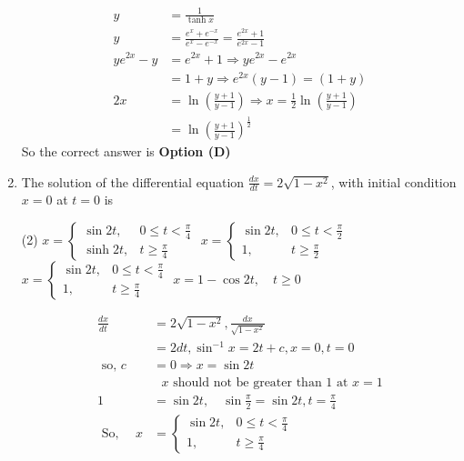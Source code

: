 \begin{enumerate}[label=\color{ocre}\textbf{\arabic*.}]
	\begin{answer}
		\begin{align*}
		y&=\frac{1}{\tanh x}\\
		y&=\frac{e^{x}+e^{-x}}{e^{x}-e^{-x}}=\frac{e^{2 x}+1}{e^{2 x}-1}\\
		y e^{2 x}-y&=e^{2 x}+1 \Rightarrow y e^{2 x}-e^{2 x}\\&=1+y \Rightarrow e^{2 x}(y-1)=(1+y)\\
		2 x&=\ln \left(\frac{y+1}{y-1}\right) \Rightarrow x=\frac{1}{2} \ln \left(\frac{y+1}{y-1}\right)\\&=\ln \left(\frac{y+1}{y-1}\right)^{\frac{1}{2}}
		\end{align*}
		So the correct answer is \textbf{Option (D)}
	\end{answer}
	\item The solution of the differential equation $\frac{d x}{d t}=2 \sqrt{1-x^{2}}$, with initial condition $x=0$ at $t=0$ is
	{}
	\begin{tasks}(2)
		\task[\textbf{A.}] $x=\left\{\begin{array}{ll}\sin 2 t, & 0 \leq t<\frac{\pi}{4} \\ \sinh 2 t, & t \geq \frac{\pi}{4}\end{array}\right.$
		\task[\textbf{B.}] $x=\left\{\begin{array}{cc}\sin 2 t, & 0 \leq t<\frac{\pi}{2} \\ 1, & t \geq \frac{\pi}{2}\end{array}\right.$
		\task[\textbf{C.}] $x=\left\{\begin{array}{cc}\sin 2 t, & 0 \leq t<\frac{\pi}{4} \\ 1, & t \geq \frac{\pi}{4}\end{array}\right.$
		\task[\textbf{D.}] $x=1-\cos 2 t, \quad t \geq 0$
	\end{tasks}
	\begin{answer}
		\begin{align*}
		\frac{d x}{d t}&=2 \sqrt{1-x^{2}}, \frac{d x}{\sqrt{1-x^{2}}}\\&=2 d t, \sin ^{-1} x=2 t+c, x=0, t=0 \\\text{ so, }c&=0 \Rightarrow x=\sin 2 t\\
		&\text{	$x$ should not be greater than 1 at $x=1$}\\
		1&=\sin 2 t, \quad \sin \frac{\pi}{2}=\sin 2 t, t=\frac{\pi}{4}\\
		\text{	So, }\quad x&=\left\{\begin{array}{ll}\sin 2 t, & 0 \leq t<\frac{\pi}{4} \\ 1, & t \geq \frac{\pi}{4}\end{array}\right.

\end{align*}
\end{answer}
\end{enumerate}
